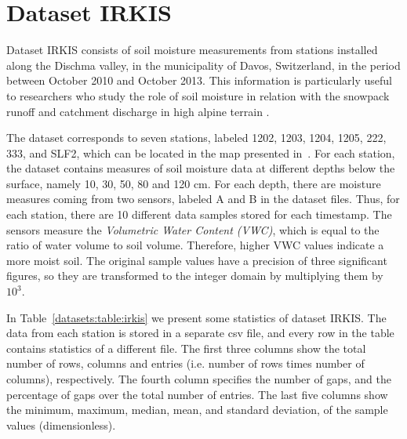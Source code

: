 
\clearpage
\section{Dataset IRKIS}
\label{datasets:irkis}


Dataset IRKIS \cite{dataset:irkis} consists of soil moisture measurements from stations installed along the Dischma valley, in the municipality of Davos, Switzerland, in the period between October 2010 and October 2013. This information is particularly useful to researchers who study the role of soil moisture in relation with the snowpack runoff and catchment discharge in high alpine terrain \cite{dataset:irkis2}. 


The dataset corresponds to seven stations, labeled 1202, 1203, 1204, 1205, 222, 333, and SLF2, which can be located in the map presented in~\cite{dataset:irkis}. For each station, the dataset contains measures of soil moisture data at different depths below the surface, namely 10, 30, 50, 80 and 120 cm. For each depth, there are moisture measures coming from two sensors, labeled A and B in the dataset files. Thus, for each station, there are 10 different data samples stored for each timestamp. The sensors measure the \textit{Volumetric Water Content (VWC)}, which is equal to the ratio of water volume to soil volume. Therefore, higher VWC values indicate a more moist soil. The original sample values have a precision of three significant figures, so they are transformed to the integer domain by multiplying them by $10^3$. 


\newcommand{\commonTable}{The first three columns show the total number of rows, columns and entries (i.e. number of rows times number of columns), respectively. The fourth column specifies the number of gaps, and the percentage of gaps over the total number of entries. The last five columns show the minimum, maximum, median, mean, and standard deviation, of the sample values }


In Table~\ref{datasets:table:irkis} we present some statistics of dataset IRKIS. The data from each station is stored in a separate csv file, and every row in the table contains statistics of a different file. \commonTable (dimensionless).




